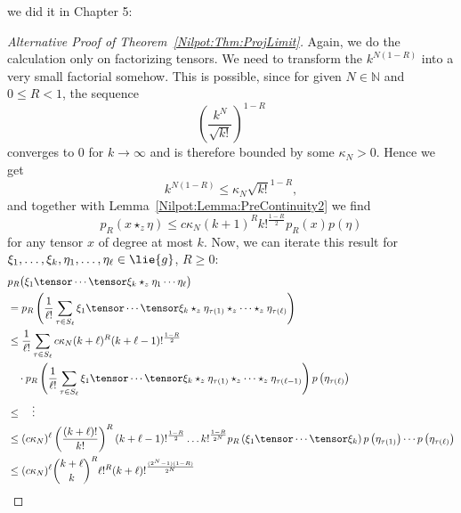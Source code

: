 we did it in Chapter 5:
\begin{proof}[Alternative Proof of Theorem~\ref{Nilpot:Thm:ProjLimit}]
	Again, we do the calculation only on factorizing tensors. We need to 
	transform the $k^{N(1-R)}$ into a very small factorial somehow. This is 
	possible, since for given $N \in \mathbb{N}$ and $0 \leq R < 1$, the 
	sequence
	\begin{equation*}
		\left( \frac{k^N}{\sqrt{k!}} \right)^{1-R}
	\end{equation*}
	converges to $0$ for $k \longrightarrow \infty$ and is therefore bounded 
	by some $\kappa_N > 0$. Hence we get
	\begin{equation*}
		k^{ N (1-R) } 
		\leq
		\kappa_N \sqrt{k!}^{1-R},
	\end{equation*}
	and together with Lemma~\ref{Nilpot:Lemma:PreContinuity2} we find
	\begin{equation*}
		p_R \left( x \star_z \eta \right)
		\leq
		c \kappa_N
		(k + 1)^R k!^{\frac{1-R}{2}} 
		p_R (x) p(\eta)
	\end{equation*}
	for any tensor $x$ of degree at most $k$. Now, we can iterate this result
	for $\xi_1, \ldots, \xi_k, \eta_1, \ldots, \eta_\ell 
	\in \lie{g}$, $R \geq 0$:
	\begin{align*}
		&
		p_R \big(
			\xi_1 \tensor \cdots \tensor \xi_k 
			\star_z 
			\eta_1 \cdots \eta_\ell
		\big)
		\\
		& =
		p_R \left(
			\frac{1}{\ell!}
			\sum\limits_{\tau \in S_\ell}
			\xi_1 \tensor \cdots \tensor  \xi_k 
			\star_z
			\eta_{\tau(1)} \star_z \cdots \star_z \eta_{\tau(\ell)}
		\right)
		\\
		& \leq
		\frac{1}{\ell!}
		\sum\limits_{\tau \in S_\ell}
		c \kappa_N
		(k + \ell)^R
		(k + \ell - 1)!^{\frac{1-R}{2}}
		\\
		& \quad 
		\cdot
		p_R \left(
			\frac{1}{\ell!}
			\sum\limits_{\tau \in S_\ell}
			\xi_1 \tensor \cdots \tensor \xi_k 
			\star_z
			\eta_{\tau(1)} \star_z \cdots \star_z \eta_{\tau(\ell-1)}
		\right)
		p\left( \eta_{\tau(\ell)} \right)
		\\
		& \leq
		\quad \vdots
		\\
		& \leq
		(c \kappa_N)^{\ell}
		\left(
			\frac{(k + \ell)!}{k!}
		\right)^R
		(k + \ell - 1)!^{\frac{1-R}{2}}
		\ldots
		k!^{\frac{1-R}{2^N}}
		p_R \left( \xi_1 \tensor \cdots \tensor \xi_k \right)
		p\left( \eta_{\tau(1)} \right)
		\cdots
		p\left( \eta_{\tau(\ell)} \right)
		\\
		& \leq
		(c \kappa_N)^{\ell}
		\binom{k + \ell}{k}^R 
		\ell!^R
		(k + \ell)!^{\frac{(2^N - 1) (1-R)}{2^N} }

\end{align*}
\end{proof}
